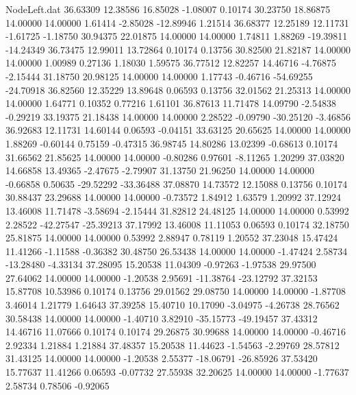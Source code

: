 \begin{filecontents}{NodeLeft.dat}
  36.63309   12.38586   16.85028    -1.08007    0.10174   30.23750   18.86875   14.00000   14.00000    1.61414   -2.85028  -12.89946    1.21514
  36.68377   12.25189   12.11731    -1.61725   -1.18750   30.94375   22.01875   14.00000   14.00000    1.74811    1.88269  -19.39811  -14.24349
  36.73475   12.99011   13.72864     0.10174    0.13756   30.82500   21.82187   14.00000   14.00000    1.00989    0.27136    1.18030    1.59575
  36.77512   12.82257   14.46716    -4.76875   -2.15444   31.18750   20.98125   14.00000   14.00000    1.17743   -0.46716  -54.69255  -24.70918
  36.82560   12.35229   13.89648     0.06593    0.13756   32.01562   21.25313   14.00000   14.00000    1.64771    0.10352    0.77216    1.61101
  36.87613   11.71478   14.09790    -2.54838   -0.29219   33.19375   21.18438   14.00000   14.00000    2.28522   -0.09790  -30.25120   -3.46856
  36.92683   12.11731   14.60144     0.06593   -0.04151   33.63125   20.65625   14.00000   14.00000    1.88269   -0.60144    0.75159   -0.47315
  36.98745   14.80286   13.02399    -0.68613    0.10174   31.66562   21.85625   14.00000   14.00000   -0.80286    0.97601   -8.11265    1.20299
  37.03820   14.66858   13.49365    -2.47675   -2.79907   31.13750   21.96250   14.00000   14.00000   -0.66858    0.50635  -29.52292  -33.36488
  37.08870   14.73572   12.15088     0.13756    0.10174   30.88437   23.29688   14.00000   14.00000   -0.73572    1.84912    1.63579    1.20992
  37.12924   13.46008   11.71478    -3.58694   -2.15444   31.82812   24.48125   14.00000   14.00000    0.53992    2.28522  -42.27547  -25.39213
  37.17992   13.46008   11.11053     0.06593    0.10174   32.18750   25.81875   14.00000   14.00000    0.53992    2.88947    0.78119    1.20552
  37.23048   15.47424   11.41266    -1.11588   -0.36382   30.48750   26.53438   14.00000   14.00000   -1.47424    2.58734  -13.28480   -4.33134
  37.28095   15.20538   11.04309    -0.97263   -1.97538   29.97500   27.64062   14.00000   14.00000   -1.20538    2.95691  -11.38764  -23.12792
  37.32153   15.87708   10.53986     0.10174    0.13756   29.01562   29.08750   14.00000   14.00000   -1.87708    3.46014    1.21779    1.64643
  37.39258   15.40710   10.17090    -3.04975   -4.26738   28.76562   30.58438   14.00000   14.00000   -1.40710    3.82910  -35.15773  -49.19457
  37.43312   14.46716   11.07666     0.10174    0.10174   29.26875   30.99688   14.00000   14.00000   -0.46716    2.92334    1.21884    1.21884
  37.48357   15.20538   11.44623    -1.54563   -2.29769   28.57812   31.43125   14.00000   14.00000   -1.20538    2.55377  -18.06791  -26.85926
  37.53420   15.77637   11.41266     0.06593   -0.07732   27.55938   32.20625   14.00000   14.00000   -1.77637    2.58734    0.78506   -0.92065

\end{filecontents}

